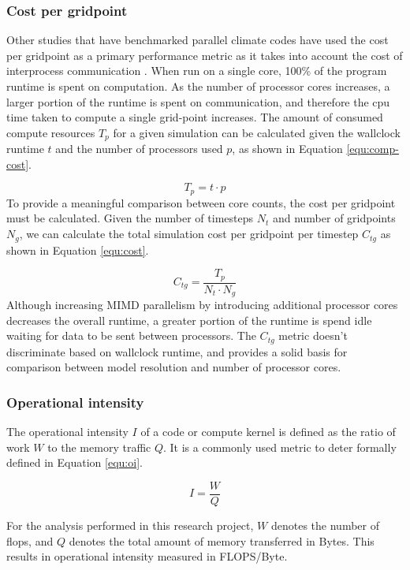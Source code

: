 \documentclass[a4paper,11pt]{report}
\begin{document}
\subsubsection{Cost per gridpoint}
Other studies that have benchmarked parallel climate codes have used the cost per gridpoint as a primary performance metric as it takes into account the cost of interprocess communication \cite{schmidt2007benchmark}. When run on a single core, 100\% of the program runtime is spent on computation. As the number of processor cores increases, a larger portion of the runtime is spent on communication, and therefore the cpu time taken to compute a single grid-point increases. The amount of consumed compute resources $T_p$ for a given simulation can be calculated given the wallclock runtime $t$ and the number of processors used $p$, as shown in Equation \ref{equ:comp-cost}.
\par
\begin{equation}
T_p = t \cdot p
\label{equ:comp-cost}
\end{equation}
To provide a meaningful comparison between core counts, the cost per gridpoint must be calculated. Given the number of timesteps $N_t$ and number of gridpoints $N_g$, we can calculate the total simulation cost per gridpoint per timestep $C_{tg}$ as shown in Equation \ref{equ:cost}. 

\begin{equation}
C_{tg} = \frac{T_p}{N_t \cdot N_g}
\label{equ:cost}
\end{equation}
Although increasing MIMD parallelism by introducing additional processor cores decreases the overall runtime, a greater portion of the runtime is spend idle waiting for data to be sent between processors. The $C_{tg}$ metric doesn't discriminate based on wallclock runtime, and provides a solid basis for comparison between model resolution and number of processor cores. 

\subsubsection{Operational intensity}
The operational intensity $I$ of a code or compute kernel is defined as the ratio of work $W$ to the memory traffic $Q$. It is a commonly used metric to deter formally defined in Equation \ref{equ:oi}.

\begin{equation}
\label{equ:oi}
I = \frac{W}{Q}
\end{equation}
\par
For the analysis performed in this research project, $W$ denotes the number of \gls{flops}, and $Q$ denotes the total amount of memory transferred in Bytes. This results in operational intensity measured in FLOPS/Byte. 
\end{document}
